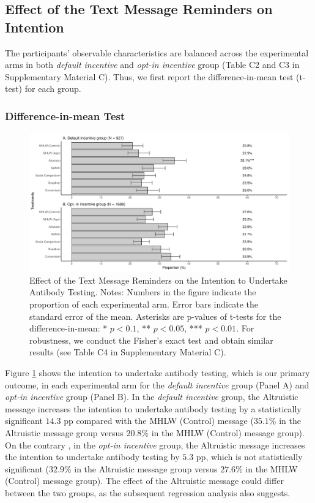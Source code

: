 \documentclass[
  11pt,
  a4paper
]{article}
\begin{document}
\hypertarget{intention}{%
\subsection{Effect of the Text Message Reminders on Intention}\label{intention}}

The participants' observable characteristics are balanced across the experimental arms in both \emph{default incentive} and \emph{opt-in incentive} group (Table C2 and C3 in Supplementary Material C). Thus, we first report the difference-in-mean test (t-test) for each group.

\hypertarget{difference-in-mean-test}{%
\subsubsection{Difference-in-mean Test}\label{difference-in-mean-test}}

\begin{figure}[t]
\includegraphics{Main-Document-LaTeX_files/figure-latex/ttest-int-test-1} \caption{Effect of the Text Message Reminders on the Intention to Undertake Antibody Testing. Notes: Numbers in the figure indicate the proportion of each experimental arm. Error bars indicate the standard error of the mean. Asterisks are p-values of t-tests for the difference-in-mean: * $p < 0.1$, ** $p < 0.05$, *** $p < 0.01$. For robustness, we conduct the Fisher's exact test and obtain similar results (see Table C4 in Supplementary Material C).}\label{fig:ttest-int-test}
\end{figure}

Figure \ref{fig:ttest-int-test} shows the intention to undertake antibody testing, which is our primary outcome, in each experimental arm for the \emph{default incentive} group (Panel A) and \emph{opt-in incentive} group (Panel B). In the \emph{default incentive} group, the Altruistic message increases the intention to undertake antibody testing by a statistically significant \(14.3\) pp compared with the MHLW (Control) message (\(35.1\)\% in the Altruistic message group versus \(20.8\)\% in the MHLW (Control) message group). On the contrary , in the \emph{opt-in incentive} group, the Altruistic message increases the intention to undertake antibody testing by \(5.3\) pp, which is not statistically significant (\(32.9\)\% in the Altruistic message group versus \(27.6\)\% in the MHLW (Control) message group). The effect of the Altruistic message could differ between the two groups, as the subsequent regression analysis also suggests.
\end{document}
